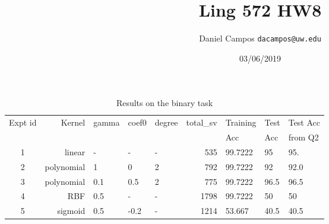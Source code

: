 \documentclass[11pt]{article}
\begin{document}
\title{Ling 572 HW8}
\author{Daniel Campos  \tt {dacampos@uw.edu}}
\date{03/06/2019}
\maketitle 

\begin{table}[h]
\centering
\caption{Results on the binary task}
\label{table1}
\begin{tabular}{|c|r|l|l|l|r|l|l|l|} \hline

Expt id & Kernel  & gamma  &  coef0  & degree & total\_sv & Training & Test & Test Acc\\ 
        &         &        &         &        &           & Acc      & Acc  &  from Q2 \\ \hline
1 & linear      & -   & -    & -  & 535 & 99.7222 & 95  & 95. \\ \hline
2 & polynomial  & 1   & 0    & 2  & 792 & 99.7222 & 92  & 92.0\\ \hline
3 & polynomial  & 0.1 & 0.5  & 2  &  775 & 99.7222 & 96.5 & 96.5\\ \hline
4 & RBF         & 0.5 & -    & -  & 1798 & 99.7222  & 50  &  50\\ \hline
5 & sigmoid     & 0.5 & -0.2 & -  & 1214 & 53.667  & 40.5 & 40.5 \\ \hline

\end{tabular}
\end{table}
\end{document}
